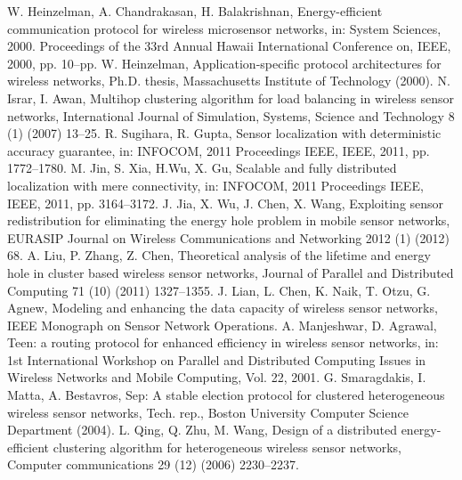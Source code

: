 \documentclass[3p,times,procedia]{elsarticle}
\begin{document}
\begin{thebibliography}{00}

 W. Heinzelman, A. Chandrakasan, H. Balakrishnan, Energy-efficient communication protocol for wireless microsensor networks,
in: System Sciences, 2000. Proceedings of the 33rd Annual Hawaii International Conference on, IEEE, 2000, pp. 10–pp.
 W. Heinzelman, Application-specific protocol architectures for wireless networks, Ph.D. thesis, Massachusetts Institute of Technology
(2000).
 N. Israr, I. Awan, Multihop clustering algorithm for load balancing in wireless sensor networks, International Journal of Simulation,
Systems, Science and Technology 8 (1) (2007) 13–25.
 R. Sugihara, R. Gupta, Sensor localization with deterministic accuracy guarantee, in: INFOCOM, 2011 Proceedings IEEE, IEEE,
2011, pp. 1772–1780.
 M. Jin, S. Xia, H.Wu, X. Gu, Scalable and fully distributed localization with mere connectivity, in: INFOCOM, 2011 Proceedings
IEEE, IEEE, 2011, pp. 3164–3172.
 J. Jia, X. Wu, J. Chen, X. Wang, Exploiting sensor redistribution for eliminating the energy hole problem in mobile sensor
networks, EURASIP Journal on Wireless Communications and Networking 2012 (1) (2012) 68.
 A. Liu, P. Zhang, Z. Chen, Theoretical analysis of the lifetime and energy hole in cluster based wireless sensor networks, Journal
of Parallel and Distributed Computing 71 (10) (2011) 1327–1355.
 J. Lian, L. Chen, K. Naik, T. Otzu, G. Agnew, Modeling and enhancing the data capacity of wireless sensor networks, IEEE
Monograph on Sensor Network Operations.
 A. Manjeshwar, D. Agrawal, Teen: a routing protocol for enhanced efficiency in wireless sensor networks, in: 1st International
Workshop on Parallel and Distributed Computing Issues in Wireless Networks and Mobile Computing, Vol. 22, 2001.
 G. Smaragdakis, I. Matta, A. Bestavros, Sep: A stable election protocol for clustered heterogeneous wireless sensor networks,
Tech. rep., Boston University Computer Science Department (2004).
 L. Qing, Q. Zhu, M. Wang, Design of a distributed energy-efficient clustering algorithm for heterogeneous wireless sensor
networks, Computer communications 29 (12) (2006) 2230–2237.

\end{thebibliography}
\end{document}
